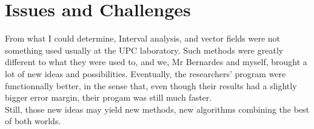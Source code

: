 \section{Issues and Challenges}

From what I could determine, Interval analysis, and vector fields were not something used usually at the UPC laboratory.
Such methods were greatly different to what they were used to, and we, Mr Bernardes and myself, brought a lot of new ideas and possibilities.
Eventually, the researchers' program were functionnally better, in the sense that, even though their results had a slightly bigger error margin, their progam was still much faster.\\
Still, those new ideas may yield new methods, new algorithms combining the best of both worlds.
